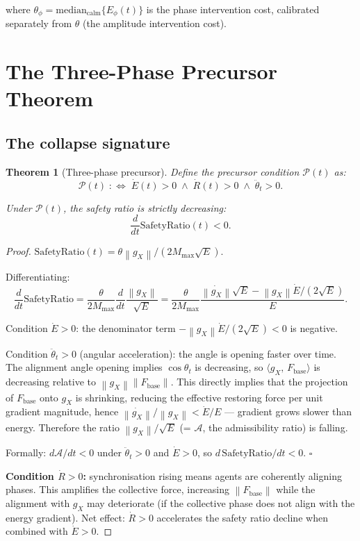 \documentclass[11pt,a4paper]{article}
\newtheorem{theorem}{Theorem}[section]
\theoremstyle{definition}
\newcommand{\norm}[1]{\left\|#1\right\|}
\newcommand{\inner}[2]{\langle #1,\,#2\rangle}
\newcommand{\Fbase}{F_{\mathrm{base}}}
\newcommand{\gX}{g_X}
\begin{document}
where $\theta_\phi = \mathrm{median}_\text{calm}\{E_\phi(t)\}$ is the phase intervention cost,
calibrated separately from $\theta$ (the amplitude intervention cost).

\section{The Three-Phase Precursor Theorem}

\subsection{The collapse signature}

\begin{theorem}[Three-phase precursor]
\label{thm:precursor}
Define the precursor condition $\mathcal{P}(t)$ as:
\[
\mathcal{P}(t) \;:\iff\; \dot E(t) > 0 \;\wedge\; \dot R(t) > 0 \;\wedge\; \ddot\theta_t > 0.
\]

Under $\mathcal{P}(t)$, the safety ratio is strictly decreasing:
\[
\frac{d}{dt}\mathrm{SafetyRatio}(t) < 0.
\]
\end{theorem}

\begin{proof}
$\mathrm{SafetyRatio}(t) = \theta\norm{\gX}/(2M_\mathrm{max}\sqrt{E})$.

Differentiating:
\[
\frac{d}{dt}\mathrm{SafetyRatio} = \frac{\theta}{2M_\mathrm{max}}
\frac{d}{dt}\frac{\norm{\gX}}{\sqrt{E}}
= \frac{\theta}{2M_\mathrm{max}}
\frac{\dot{\norm{\gX}}\sqrt{E} - \norm{\gX}\dot E/(2\sqrt{E})}{E}.
\]

Condition $\dot E > 0$: the denominator term $-\norm{\gX}\dot E/(2\sqrt{E}) < 0$ is negative.

Condition $\ddot\theta_t > 0$ (angular acceleration): the angle is opening faster over time.
The alignment angle opening implies $\cos\theta_t$ is decreasing, so
$\inner{\gX}{\Fbase}$ is decreasing relative to $\norm{\gX}\norm{\Fbase}$.
This directly implies that the projection of $\Fbase$ onto $\gX$ is shrinking,
reducing the effective restoring force per unit gradient magnitude,
hence $\dot{\norm{\gX}}/\norm{\gX} < \dot E/E$ — gradient grows slower than energy.
Therefore the ratio $\norm{\gX}/\sqrt{E}$ (= $\mathcal{A}$, the admissibility ratio) is falling.

Formally: $d\mathcal{A}/dt < 0$ under $\ddot\theta_t > 0$ and $\dot E > 0$, so
$d\,\mathrm{SafetyRatio}/dt < 0$. $\square$

\textbf{Condition $\dot R > 0$:} synchronisation rising means agents are coherently aligning
phases. This amplifies the collective force, increasing $\norm{\Fbase}$ while
the alignment with $\gX$ may deteriorate (if the collective phase does not align with the energy gradient).
Net effect: $\dot R > 0$ accelerates the safety ratio decline when combined with $\dot E > 0$.
\end{proof}
\end{document}
